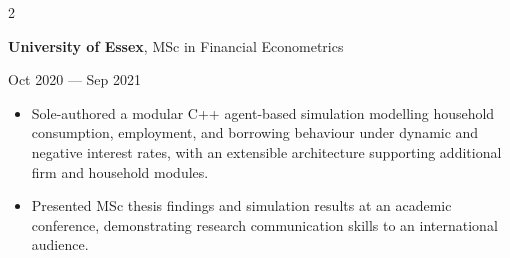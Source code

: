\documentclass[6pt, letterpaper]{article}
\newenvironment{highlights}{
    \begin{itemize}[
        topsep=0.03 cm,
        parsep=0.03 cm,
        partopsep=0pt,
        itemsep=0pt,
        leftmargin=0 cm + 10pt
    ]
}{
    \end{itemize}
} %
\newenvironment{twocolentry}[2][]{
    \onecolentry
    \def\secondColumn{#2}
    \setcolumnwidth{\fill, 4.5 cm}
    \begin{paracol}{2}
}{
    \switchcolumn \raggedleft \secondColumn
    \end{paracol}
    \endonecolentry
} %
\begin{document}
            \begin{twocolentry}{
                Oct 2020 --- Sep 2021
            }
            \textbf{University of Essex}, MSc in Financial Econometrics
            \end{twocolentry}

            \begin{highlights}

            \item Sole-authored a modular C++ agent-based simulation modelling household consumption, employment, and borrowing behaviour under dynamic and negative interest rates, with an extensible architecture supporting additional firm and household modules.
            \item Presented MSc thesis findings and simulation results at an academic conference, demonstrating research communication skills to an international audience.

            \end{highlights}
\end{document}

